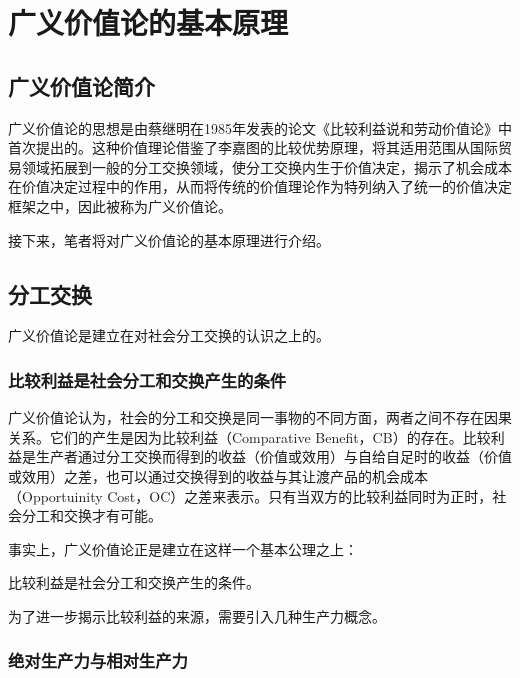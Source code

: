
\chapter{广义价值论的基本原理}

\section{广义价值论简介}

广义价值论的思想是由蔡继明在1985年发表的论文《比较利益说和劳动价值论》\cite{CaiJiMingBiJiaoLiYiShuoYuLaoDongJieZhiLun1985}中首次提出的。这种价值理论借鉴了李嘉图的比较优势原理，将其适用范围从国际贸易领域拓展到一般的分工交换领域，使分工交换内生于价值决定，揭示了机会成本在价值决定过程中的作用，从而将传统的价值理论作为特列纳入了统一的价值决定框架之中，因此被称为广义价值论\cite[221]{LiRenJunJieZhiLiLun2004}。

接下来，笔者将对广义价值论的基本原理进行介绍。

\section{分工交换}

广义价值论是建立在对社会分工交换的认识之上的。

\subsection{比较利益是社会分工和交换产生的条件}

广义价值论认为，社会的分工和交换是同一事物的不同方面，两者之间不存在因果关系。它们的产生是因为比较利益（Comparative Benefit，CB）的存在。比较利益是生产者通过分工交换而得到的收益（价值或效用）与自给自足时的收益（价值或效用）之差，也可以通过交换得到的收益与其让渡产品的机会成本（Opportuinity Cost，OC）之差来表示。只有当双方的比较利益同时为正时，社会分工和交换才有可能\cite[32]{CaiJiMingLunFenGongYuJiaoHuanDeQiYuanHeJiaoHuanBiLiDeQueDingGuangYiJieZhiLunGangShang1999}。

事实上，广义价值论正是建立在这样一个基本公理之上：

\begin{axiom}
    \label{Bijiaoliyishishehuifengonghejiaohuanchanshengdetiaojian}
    比较利益是社会分工和交换产生的条件。
\end{axiom}

为了进一步揭示比较利益的来源，需要引入几种生产力概念。

\subsection{绝对生产力与相对生产力}

